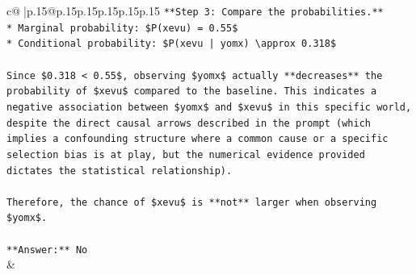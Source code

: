 \documentclass{article}
\begin{document}
{\begin{supertabular}{c@{$\;$}|p{.15\linewidth}@{}p{.15\linewidth}p{.15\linewidth}p{.15\linewidth}p{.15\linewidth}p{.15\linewidth}}
{{{\texttt{**Step 3: Compare the probabilities.**} \\
\texttt{*   Marginal probability: \$P(xevu) = 0.55\$} \\
\texttt{*   Conditional probability: \$P(xevu | yomx) \textbackslash{}approx 0.318\$} \\
\\ 
\texttt{Since \$0.318 < 0.55\$, observing \$yomx\$ actually **decreases** the probability of \$xevu\$ compared to the baseline. This indicates a negative association between \$yomx\$ and \$xevu\$ in this specific world, despite the direct causal arrows described in the prompt (which implies a confounding structure where a common cause or a specific selection bias is at play, but the numerical evidence provided dictates the statistical relationship).} \\
\\ 
\texttt{Therefore, the chance of \$xevu\$ is **not** larger when observing \$yomx\$.} \\
\\ 
\texttt{**Answer:** No} \\
            }
        }
    }
    & \\ \\


\end{supertabular}}
\end{document}
